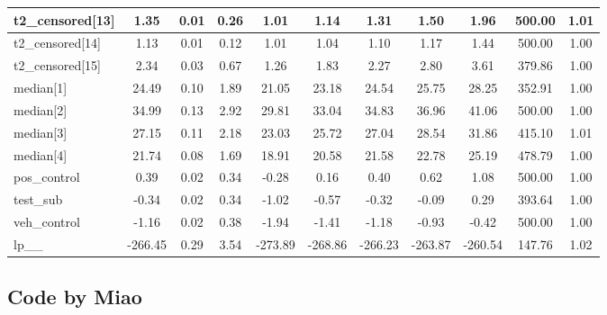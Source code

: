 \documentclass[]{article}
\begin{document}
\begin{table}
\begin{tabular}[t]{l|c|c|c|c|c|c|c|c|c|c}
\hline
t2\_censored[13] & 1.35 & 0.01 & 0.26 & 1.01 & 1.14 & 1.31 & 1.50 & 1.96 & 500.00 & 1.01\\
\hline
t2\_censored[14] & 1.13 & 0.01 & 0.12 & 1.01 & 1.04 & 1.10 & 1.17 & 1.44 & 500.00 & 1.00\\
\hline
t2\_censored[15] & 2.34 & 0.03 & 0.67 & 1.26 & 1.83 & 2.27 & 2.80 & 3.61 & 379.86 & 1.00\\
\hline
median[1] & 24.49 & 0.10 & 1.89 & 21.05 & 23.18 & 24.54 & 25.75 & 28.25 & 352.91 & 1.00\\
\hline
median[2] & 34.99 & 0.13 & 2.92 & 29.81 & 33.04 & 34.83 & 36.96 & 41.06 & 500.00 & 1.00\\
\hline
median[3] & 27.15 & 0.11 & 2.18 & 23.03 & 25.72 & 27.04 & 28.54 & 31.86 & 415.10 & 1.01\\
\hline
median[4] & 21.74 & 0.08 & 1.69 & 18.91 & 20.58 & 21.58 & 22.78 & 25.19 & 478.79 & 1.00\\
\hline
pos\_control & 0.39 & 0.02 & 0.34 & -0.28 & 0.16 & 0.40 & 0.62 & 1.08 & 500.00 & 1.00\\
\hline
test\_sub & -0.34 & 0.02 & 0.34 & -1.02 & -0.57 & -0.32 & -0.09 & 0.29 & 393.64 & 1.00\\
\hline
veh\_control & -1.16 & 0.02 & 0.38 & -1.94 & -1.41 & -1.18 & -0.93 & -0.42 & 500.00 & 1.00\\
\hline
lp\_\_ & -266.45 & 0.29 & 3.54 & -273.89 & -268.86 & -266.23 & -263.87 & -260.54 & 147.76 & 1.02\\
\hline
\end{tabular}
\end{table}

\subsection{Code by Miao}\label{code-by-miao}
\end{document}
